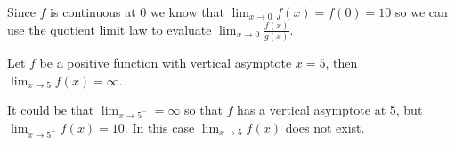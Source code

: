 \documentclass{ximera}
\begin{document}
\begin{exercise}
\begin{exercise}
\begin{exercise}
\begin{exercise}
\begin{multipleChoice}
\end{multipleChoice}

\begin{feedback}
Since $f$ is continuous at 0 we know that $\lim_{x\to0}f(x) = f(0) = 10$ so we can use the quotient limit law to evaluate $\lim_{x\to0}\frac{f(x)}{g(x)}$.
\end{feedback}

\begin{exercise}

Let $f$ be a positive function with vertical asymptote $x=5$, then $\lim_{x\to5}f(x) = \infty$.

\begin{multipleChoice}
\end{multipleChoice}

\begin{feedback}
It could be that $\lim_{x\to5^-} = \infty$ so that $f$ has a vertical asymptote at 5, but $\lim_{x\to5^+}f(x)=10$.  In this case $\lim_{x\to5}f(x)$ does not exist.
\end{feedback}

\end{exercise}
\end{exercise}
\end{exercise}
\end{exercise}
\end{exercise}
\end{document}
